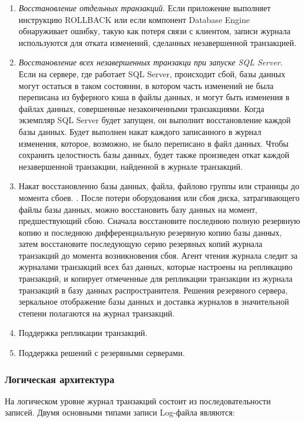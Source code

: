 \begin{enumerate}
	\item \textit{Восстановление отдельных транзакций}. Если приложение выполняет инструкцию ROLLBACK или если 
	компонент Database Engine обнаруживает ошибку, такую как потеря связи с клиентом, записи журнала используются 
	для отката изменений, сделанных незавершенной транзакцией.
	\item \textit{Восстановление всех незавершенных транзакци при запуске SQL Server}. Если на сервере, где работает SQL
	Server, происходит сбой, базы данных могут остаться в таком состоянии, в котором часть изменений не была 
	переписана из буферного кэша в файлы данных, и могут быть изменения в файлах данных, совершенные 
	незаконченными транзакциями. Когда экземпляр SQL Server будет запущен, он выполнит восстановление каждой 
	базы данных. Будет выполнен накат каждого записанного в журнал изменения, которое, возможно, не было 
	переписано в файл данных. Чтобы сохранить целостность базы данных, будет также произведен откат каждой 
	незавершенной транзакции, найденной в журнале транзакций.
	\item Накат восстановленно базы данных, файла, файлово группы или страницы до момента сбоев. . После потери 
	оборудования или сбоя диска, затрагивающего файлы базы данных, можно восстановить базу данных на момент, 
	предшествующий сбою. Сначала восстановите последнюю полную резервную копию и последнюю 
	дифференциальную резервную копию базы данных, затем восстановите последующую серию резервных копий 
	журнала транзакций до момента возникновения сбоя. Агент чтения журнала следит за журналами транзакций всех баз данных, 
	которые настроены на репликацию транзакций, и копирует отмеченные для репликации транзакции из журнала 
	транзакций в базу данных распространителя. Решения резервного сервера, зеркальное отображение базы данных 
	и доставка журналов в значительной степени полагаются на журнал транзакций. 
	\item Поддержка репликации транзакций.
	\item Поддержка решений с резервными серверами.
\end{enumerate}

\subsubsection{Логическая архитектура}

На логическом уровне журнал транзакций состоит из последовательности записей. Двумя основными типами записи Log-файла являются:

